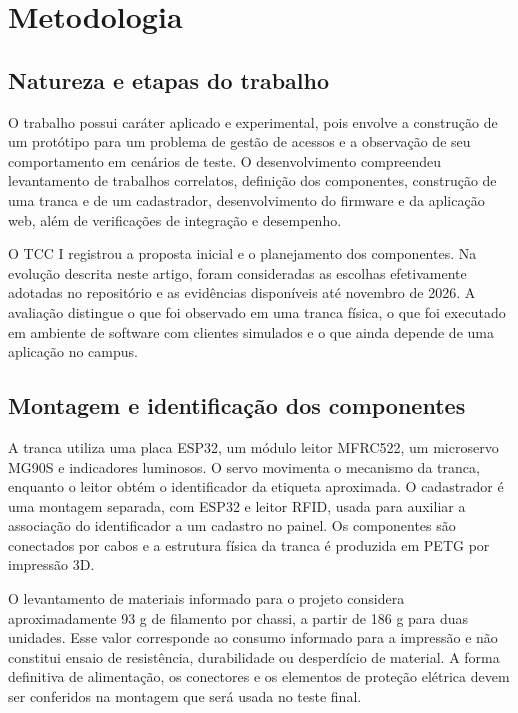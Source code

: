 \documentclass[12pt]{article}
\begin{document}
\section{Metodologia}

\subsection{Natureza e etapas do trabalho}

O trabalho possui caráter aplicado e experimental, pois envolve a construção de um protótipo para um problema de gestão de acessos e a observação de seu comportamento em cenários de teste. O desenvolvimento compreendeu levantamento de trabalhos correlatos, definição dos componentes, construção de uma tranca e de um cadastrador, desenvolvimento do firmware e da aplicação web, além de verificações de integração e desempenho.

O TCC I registrou a proposta inicial e o planejamento dos componentes. Na evolução descrita neste artigo, foram consideradas as escolhas efetivamente adotadas no repositório e as evidências disponíveis até novembro de 2026. A avaliação distingue o que foi observado em uma tranca física, o que foi executado em ambiente de software com clientes simulados e o que ainda depende de uma aplicação no campus.

\subsection{Montagem e identificação dos componentes}

A tranca utiliza uma placa ESP32, um módulo leitor MFRC522, um microservo MG90S e indicadores luminosos. O servo movimenta o mecanismo da tranca, enquanto o leitor obtém o identificador da etiqueta aproximada. O cadastrador é uma montagem separada, com ESP32 e leitor RFID, usada para auxiliar a associação do identificador a um cadastro no painel. Os componentes são conectados por cabos e a estrutura física da tranca é produzida em PETG por impressão 3D.

O levantamento de materiais informado para o projeto considera aproximadamente 93 g de filamento por chassi, a partir de 186 g para duas unidades. Esse valor corresponde ao consumo informado para a impressão e não constitui ensaio de resistência, durabilidade ou desperdício de material. A forma definitiva de alimentação, os conectores e os elementos de proteção elétrica devem ser conferidos na montagem que será usada no teste final.
\end{document}
